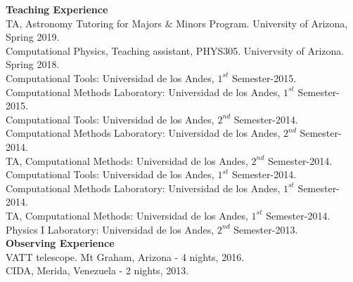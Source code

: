 \documentclass[UTF8]{article}
\begin{document}
{\Large \textbf{Teaching Experience}}\\

\indent\indent TA, Astronomy Tutoring for
Majors \& Minors Program. University of Arizona, Spring 2019. \\
\indent\indent Computational Physics, Teaching assistant, PHYS305. Univervsity of Arizona. Spring 2018.\\
\indent\indent Computational Tools: Universidad de los Andes, $1^{st}$ Semester-2015.\\
\indent\indent Computational Methods Laboratory: Universidad de los Andes, $1^{st}$ Semester-2015.\\
\indent\indent Computational Tools: Universidad de los Andes, $2^{nd}$ Semester-2014.\\
\indent\indent Computational Methods Laboratory: Universidad de los Andes, $2^{nd}$ Semester-2014.\\
\indent\indent TA, Computational Methods: Universidad de los Andes, $2^{nd}$ Semester-2014.\\
\indent\indent Computational Tools: Universidad de los Andes, $1^{st}$ Semester-2014.\\
\indent\indent Computational Methods Laboratory: Universidad de los Andes, $1^{st}$ Semester-2014.\\
\indent\indent TA, Computational Methods: Universidad de los Andes, $1^{st}$ Semester-2014.\\
\indent\indent Physics I Laboratory: Universidad de los Andes, $2^{nd}$ Semester-2013.\\


{\Large \textbf{Observing Experience}}\\

\indent\indent VATT telescope. Mt Graham, Arizona - 4 nights, 2016.\\
\indent\indent CIDA, Merida, Venezuela - 2 nights, 2013.\\







\end{document}
